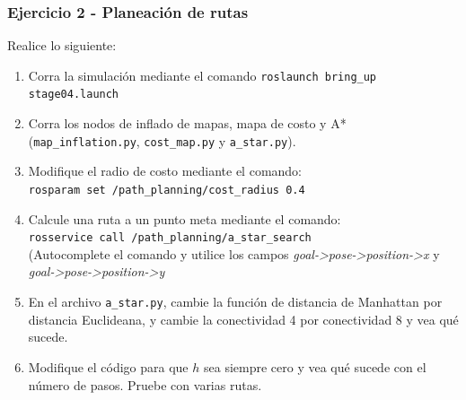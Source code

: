 \documentclass[10pt,spanish,aspectratio=1610]{beamer}
\begin{document}
\begin{frame}[containsverbatim]\frametitle{Ejercicio 2 - Planeación de rutas}
  Realice lo siguiente:
  \begin{enumerate}
    \item Corra la simulación mediante el comando \texttt{roslaunch bring\_up stage04.launch}
  \item Corra los nodos de inflado de mapas, mapa de costo y A* (\texttt{map\_inflation.py}, \texttt{cost\_map.py} y \texttt{a\_star.py}). 
  \item Modifique el radio de costo mediante el comando:\\
    \texttt{rosparam set /path\_planning/cost\_radius 0.4}
  \item Calcule una ruta a un punto meta mediante el comando:\\
    \texttt{rosservice call /path\_planning/a\_star\_search}\\
    (Autocomplete el comando y utilice los campos \textit{goal->pose->position->x} y \textit{goal->pose->position->y}
  \item En el archivo \texttt{a\_star.py}, cambie la función de distancia de Manhattan por distancia Euclideana, y cambie la conectividad 4 por conectividad 8 y vea qué sucede.
  \item Modifique el código para que $h$ sea siempre cero y vea qué sucede con el número de pasos. Pruebe con varias rutas. 
  \end{enumerate}
\end{frame}
\end{document}
